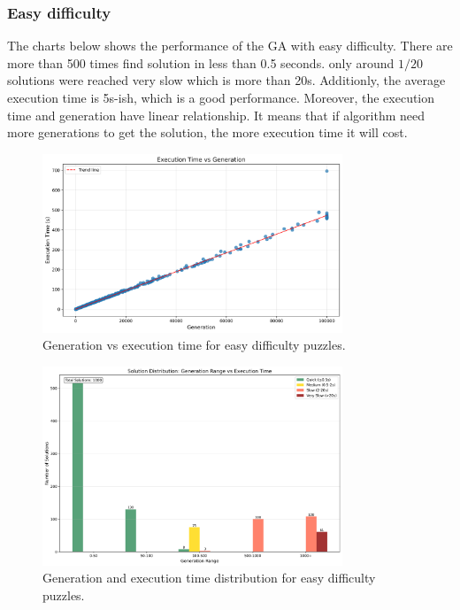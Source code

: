 \subsubsection{Easy difficulty}

The charts below shows the performance of the GA with easy difficulty. There are more than 500 times find solution in less than 0.5 seconds. only around $1/20$ solutions were reached very slow which is more than 20s.
Additionly, the average execution time is 5s-ish, which is a good performance. Moreover, the execution time and generation have linear relationship. It means that if algorithm need more generations to get the solution, the more execution time it will cost.

\begin{figure}[H]
\centering
\includegraphics[width=0.8\textwidth]{resources/generation_vs_execution_time_easy.png}
\caption{Generation vs execution time for easy difficulty puzzles.}
\label{fig:generation_vs_execution_time_easy}
\end{figure}

\begin{figure}[H]
\centering
\includegraphics[width=0.8\textwidth]{resources/generation_execution_time_bars_easy.png}
\caption{Generation and execution time distribution for easy difficulty puzzles.}
\label{fig:generation_execution_time_bars_easy}
\end{figure}

